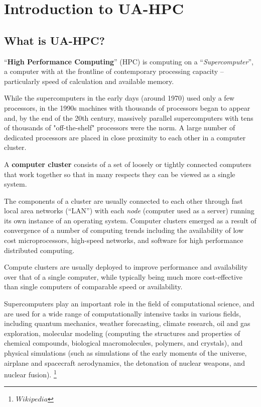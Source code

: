 \chapter{Introduction to UA-HPC}

\section{What is UA-HPC?}

``\textbf{High Performance Computing}'' (HPC) is computing on a
``\textit{Supercomputer}'', a computer with at the frontline of contemporary
processing capacity -- particularly speed of calculation and available memory.

While the supercomputers in the early days (around 1970) used only a few
processors, in the 1990s machines with thousands of processors began to appear
and, by the end of the 20th century, massively parallel supercomputers with
tens of thousands of "off-the-shelf" processors were the norm. A large number
of dedicated processors are placed in close proximity to each other in a
computer cluster.

A \textbf{computer cluster} consists of a set of loosely or tightly connected
computers that work together so that in many respects they can be viewed as a
single system.

The components of a cluster are usually connected to each other through fast
local area networks (``LAN'') with each \textit{node} (computer used as a
server) running its own instance of an operating system. Computer clusters
emerged as a result of convergence of a number of computing trends including
the availability of low cost microprocessors, high-speed networks, and software
for high performance distributed computing.

Compute clusters are usually deployed to improve performance and availability
over that of a single computer, while typically being much more cost-effective
than single computers of comparable speed or availability.

Supercomputers play an important role in the field of computational science,
and are used for a wide range of computationally intensive tasks in various
fields, including quantum mechanics, weather forecasting, climate research, oil
and gas exploration, molecular modeling (computing the structures and
properties of chemical compounds, biological macromolecules, polymers, and
crystals), and physical simulations (such as simulations of the early moments
of the universe, airplane and spacecraft aerodynamics, the detonation of
nuclear weapons, and nuclear fusion). \footnote{ $ Wikipedia$ }

